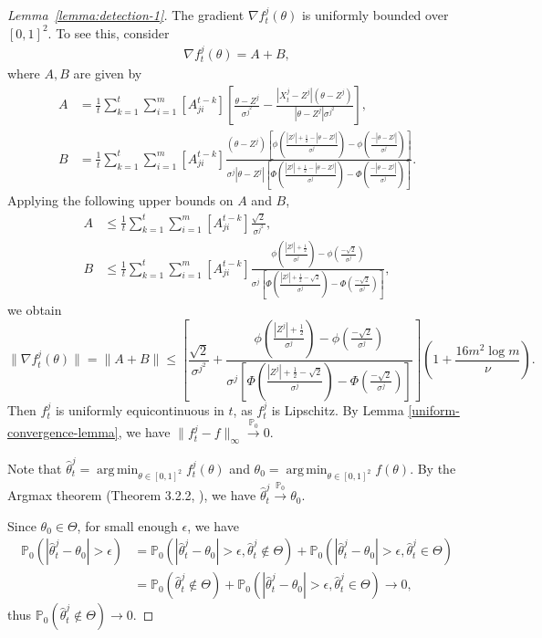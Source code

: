 \documentclass[twoside,11pt]{article}
\numberwithin{equation}{section}
\newcommand\bP{\mathbb{P}}
\newcommand{\pto}{\stackrel{\bP_0}{\to}}
\DeclareMathOperator*{\argmin}{arg\,min}
\begin{document}
{\begin{proof}[Lemma~\ref{lemma:detection-1}]
The gradient $\nabla f_t^j(\theta)$ is uniformly bounded over $[0,1]^2$. To see this, consider
\begin{align*}
\nabla f_t^j(\theta) = A + B, 
\end{align*}
where $A, B$ are given by 
\begin{align*}
    A &=  \frac{1}{t} \sum_{k = 1}^t \sum_{i = 1}^m [A^{t-k}_{ji}] \left[\frac{\theta - Z^j}{\sigma^{j^2}} - \frac{|X_t^j - Z^j| (\theta - Z^j)}{|\theta - Z^j|\sigma^{j^2}}\right], \\
    B &=  \frac{1}{t} \sum_{k = 1}^t \sum_{i = 1}^m [A^{t-k}_{ji}] \frac{(\theta - Z^j)\left[\phi\left(\frac{|Z^j| + \frac{1}{2} - |\theta - Z^j|}{\sigma^j}\right) - \phi\left(\frac{-|\theta - Z^j|}{\sigma^j}\right)\right]}{\sigma^j |\theta - Z^j|\left[\Phi\left(\frac{|Z^j| + \frac{1}{2} - |\theta - Z^j|}{\sigma^j}\right) - \Phi\left(\frac{-|\theta - Z^j|}{\sigma^j}\right)\right]}.
\end{align*}
Applying the following upper bounds on $A$ and $B$,
\begin{align*}
    A &\leq \frac{1}{t} \sum_{k = 1}^t \sum_{i = 1}^m [A^{t-k}_{ji}] \frac{\sqrt{2}}{\sigma^{j^2}}, \\
    B &\leq \frac{1}{t} \sum_{k = 1}^t \sum_{i = 1}^m [A^{t-k}_{ji}] \frac{\phi\left(\frac{|Z^j| + \frac{1}{2}}{\sigma^j}\right) - \phi\left(\frac{-\sqrt{2}}{\sigma^j}\right)}{\sigma^j\left[\Phi\left(\frac{|Z^j| + \frac{1}{2} - \sqrt{2}}{\sigma^j}\right) - \Phi\left(\frac{-\sqrt{2}}{\sigma^j}\right)\right]},
\end{align*}
we obtain
\begin{equation*}
    \|\nabla f_t^j(\theta)\| = \|A + B\| \leq \left[ \frac{\sqrt{2}}{ \sigma^{j^2}} + \frac{\phi(\frac{|Z^j|+ \frac{1}{2}}{\sigma^j}) - \phi(\frac{- \sqrt{2}}{\sigma^j}) }{\sigma^j\left[\Phi(\frac{|Z^j|+ \frac{1}{2} - \sqrt{2}}{\sigma^j}) - \Phi(\frac{- \sqrt{2}}{\sigma^j}) \right]} \right]\left(1 + \frac{16 m^2 \log m}{\nu} \right). 
\end{equation*}
Then $f_t^j$ is uniformly equicontinuous in $t$, as $f_t^j$ is Lipschitz.  By Lemma \ref{uniform-convergence-lemma}, we have $\|f_t^j - f\|_\infty \pto 0$. 


Note that $\hat{\theta}_t^j = \argmin_{\theta \in [0,1]^2} f_t^j(\theta)$ and $\theta_0 = \argmin_{\theta \in [0,1]^2} f(\theta)$. By the Argmax theorem (Theorem 3.2.2, \cite{vaart2023empirical}), we have $\hat{\theta}_t^j \pto \theta_0$. 

Since $\theta_0 \in \Theta$, for small enough $\epsilon$, we have
\begin{align*}
    \bP_0(|\hat \theta_t^j - \theta_0| > \epsilon) &= \bP_0(|\hat \theta_t^j  - \theta_0| > \epsilon, \hat \theta_t^j  \notin \Theta) + \bP_0(|\hat \theta_t^j - \theta_0| > \epsilon, \hat \theta_t^j \in \Theta)  \\
    &= \bP_0(\hat \theta_t^j \notin \Theta) + \bP_0(|\hat \theta_t^j - \theta_0| > \epsilon, \hat \theta_t^j \in \Theta) \to 0, 
\end{align*}
thus $\bP_0(\hat \theta_t^j \notin \Theta) \to 0$. 
\end{proof}

}
\end{document}
